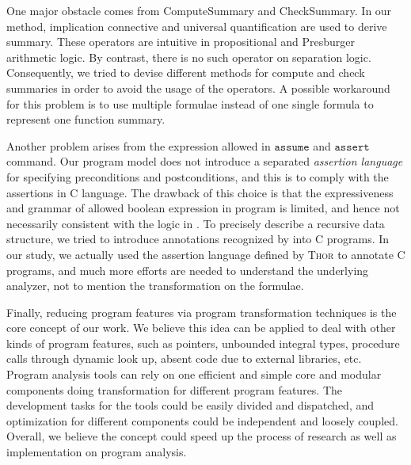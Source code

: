 One major obstacle comes from \textmd{ComputeSummary} and \textmd{CheckSummary}.
In our method, implication connective and universal quantification are used to
derive summary.
These operators are intuitive in propositional and Presburger arithmetic logic.
By contrast, there is no such operator on separation logic.
Consequently, we tried to devise different methods for compute and check
summaries in order to avoid the usage of the operators.
A possible workaround for this problem is to use multiple formulae instead of
one single formula to represent one function summary.

Another problem arises from the expression allowed in $\mathtt{assume}$ and
$\mathtt{assert}$ command.
Our program model does not introduce a separated \emph{assertion language} for
specifying preconditions and postconditions,
and this is to comply with the assertions in C language.
The drawback of this choice is that the expressiveness and grammar of allowed
boolean expression in program is limited,
and hence not necessarily consistent with the logic in .
To precisely describe a recursive data structure, we tried to introduce
annotations recognized by  into C programs.
In our study, we actually used the assertion language defined by \textsc{Thor}
to annotate C programs,
and much more efforts are needed to understand the underlying analyzer,
not to mention the transformation on the formulae.

Finally, reducing program features via program transformation techniques is the
core concept of our work.
We believe this idea can be applied to deal with other kinds of program
features, such as pointers, unbounded integral types, procedure calls through
dynamic look up, absent code due to external libraries, etc.
Program analysis tools can rely on one efficient and simple core
 and modular components doing transformation for different
program features.
The development tasks for the tools could be easily divided and dispatched,
and optimization for different components could be independent and loosely
coupled.
Overall, we believe the concept could speed up the process of research as well
as implementation on program analysis.
